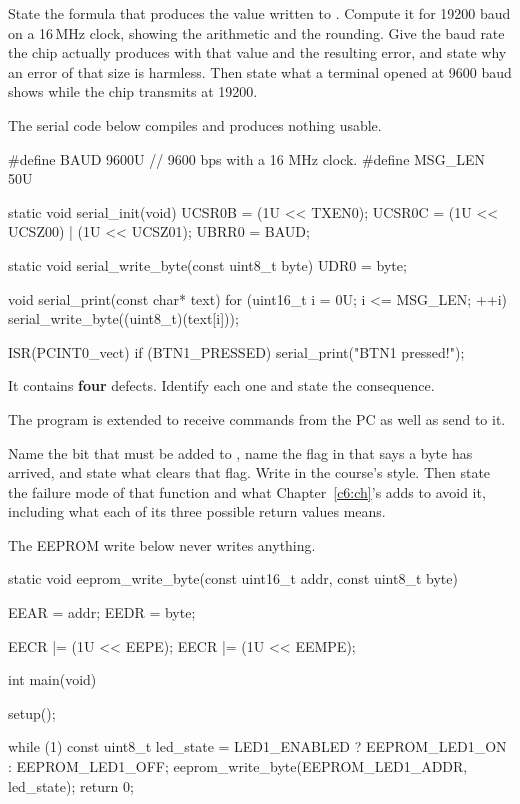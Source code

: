  State the formula that produces the value written to . Compute it for 19200
baud on a 16\,MHz clock, showing the arithmetic and the rounding. Give the baud rate the chip
actually produces with that value and the resulting error, and state why an error of that size is
harmless. Then state what a terminal opened at 9600 baud shows while the chip transmits at 19200.

 The serial code below compiles and produces nothing usable.

\begin{ccode}
#define BAUD 9600U // 9600 bps with a 16 MHz clock.
#define MSG_LEN 50U

static void serial_init(void)
{
    UCSR0B = (1U << TXEN0);
    UCSR0C = (1U << UCSZ00) | (1U << UCSZ01);
    UBRR0  = BAUD;
}

static void serial_write_byte(const uint8_t byte)
{
    UDR0 = byte;
}

void serial_print(const char* text)
{
    for (uint16_t i = 0U; i <= MSG_LEN; ++i)
    {
        serial_write_byte((uint8_t)(text[i]));
    }
}

ISR(PCINT0_vect)
{
    if (BTN1_PRESSED) { serial_print("BTN1 pressed!"); }
}
\end{ccode}

\noindent It contains \textbf{four} defects. Identify each one and state the consequence.

 The program is extended to receive commands from the PC as well as send to it.

Name the bit that must be added to , name the flag in  that says a byte
has arrived, and state what clears that flag. Write  in the course's
style. Then state the failure mode of that function and what Chapter~\ref{c6:ch}'s 
adds to avoid it, including what each of its three possible return values means. 

\label{exa:q:6}

 The EEPROM write below never writes anything.

\begin{ccode}
static void eeprom_write_byte(const uint16_t addr, const uint8_t byte)
{
    EEAR = addr;
    EEDR = byte;

    EECR |= (1U << EEPE);
    EECR |= (1U << EEMPE);
}

int main(void)
{
    setup();

    while (1)
    {
        const uint8_t led_state = LED1_ENABLED ? EEPROM_LED1_ON : EEPROM_LED1_OFF;
        eeprom_write_byte(EEPROM_LED1_ADDR, led_state);
    }
    return 0;
}
\end{ccode}

